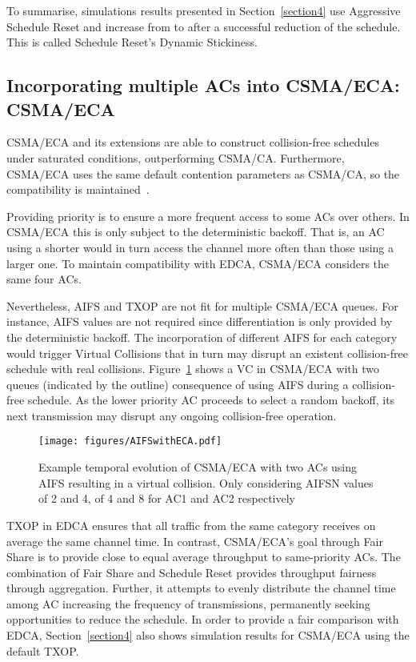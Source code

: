 \documentclass[a4paper]{article}
\begin{document}
To summarise, simulations results presented in Section~\ref{section4} use Aggressive Schedule Reset and increase from  to  after a successful reduction of the schedule. This is called Schedule Reset's Dynamic Stickiness. 

\subsection{Incorporating multiple ACs into CSMA/ECA: CSMA/ECA}
CSMA/ECA and its extensions are able to construct collision-free schedules under saturated conditions, outperforming CSMA/CA. Furthermore, CSMA/ECA uses the same default contention parameters as CSMA/CA, so the compatibility is maintained~\cite{sanabria2014high}.

Providing priority is to ensure a more frequent access to some ACs over others. In CSMA/ECA this is only subject to the deterministic backoff. That is, an AC using a shorter  would in turn access the channel more often than those using a larger one. To maintain compatibility with EDCA, CSMA/ECA considers the same four ACs.

Nevertheless, AIFS and TXOP are not fit for multiple CSMA/ECA queues. For instance, AIFS values are not required since differentiation is only provided by the deterministic backoff. The incorporation of different AIFS for each category would trigger Virtual Collisions that in turn may disrupt an existent collision-free schedule with real collisions. Figure~\ref{fig:AIFSinECA} shows a VC in CSMA/ECA with two queues (indicated by the outline) consequence of using AIFS during a collision-free schedule. As the lower priority AC proceeds to select a random backoff, its next transmission may disrupt any ongoing collision-free operation.

	\begin{figure}[tb]
	\centering
		\texttt{[image: figures/AIFSwithECA.pdf]}
		\caption{Example temporal evolution of CSMA/ECA with two ACs using AIFS resulting in a virtual collision. Only considering AIFSN values of 2 and 4,  of 4 and 8 for AC1 and AC2 respectively}
		\label{fig:AIFSinECA}
	\end{figure}


TXOP in EDCA ensures that all traffic from the same category receives on average the same channel time. In contrast, CSMA/ECA's goal through Fair Share is to provide close to equal average throughput to same-priority ACs. The combination of Fair Share and Schedule Reset provides throughput fairness through aggregation. Further, it attempts to evenly distribute the channel time among AC increasing the frequency of transmissions, permanently seeking opportunities to reduce the schedule. In order to provide a fair comparison with EDCA, Section~\ref{section4} also shows simulation results for CSMA/ECA using the default TXOP.
\end{document}
